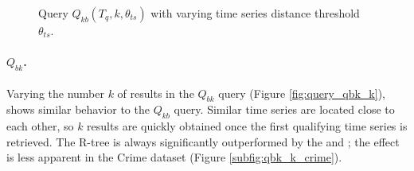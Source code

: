\begin{figure}[!tb]
	\caption{Query $Q_{kb}(T_q, k, \theta_{ts})$ with varying time series distance threshold $\theta_{ts}$.}
	\label{fig:query_qkb_theta_ts}
\end{figure}


\paragraph{$Q_{bk}$.} Varying the number $k$ of results in the $Q_{bk}$ query (Figure \ref{fig:query_qbk_k}), shows similar behavior to the $Q_{kb}$ query. Similar time series are located close to each other, so $k$ results are quickly obtained once the first qualifying time series is retrieved. The R-tree is always significantly outperformed by the \tsr and \btsr;  the effect is less apparent in the Crime dataset (Figure \ref{subfig:qbk_k_crime}).

